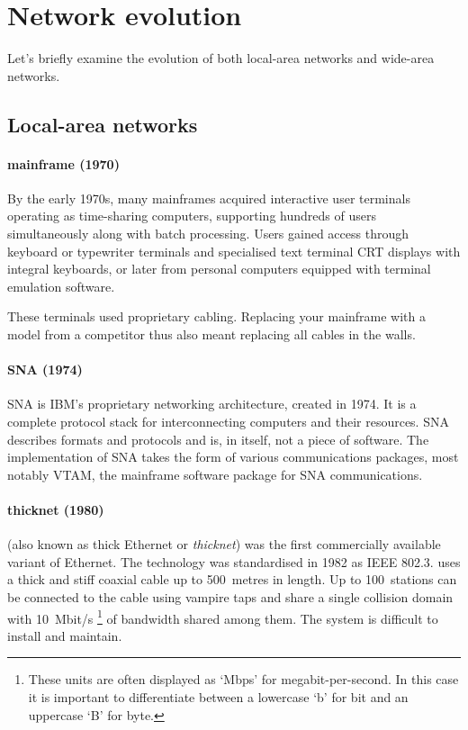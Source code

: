 \section{Network evolution}
\label{sec:network-evolution}

Let's briefly examine the evolution of both local-area networks and wide-area networks.

\subsection{Local-area networks}
\label{sec:network-evolution-lan}

\paragraph{mainframe (1970)}%
By the early 1970s, many mainframes acquired interactive user terminals operating as time-sharing computers, supporting hundreds of users simultaneously along with batch processing.
Users gained access through keyboard or typewriter terminals%
and specialised text terminal \gls{CRT} displays with integral keyboards, or later from personal computers equipped with terminal emulation software.

These terminals used proprietary cabling.
Replacing your mainframe with a model from a competitor thus also meant replacing all cables in the walls.
    
\paragraph{\acl{SNA} (1974)}
\Gls{SNA} is IBM's proprietary networking architecture, created in 1974.
It is a complete protocol stack for interconnecting computers and their resources.
\gls{SNA} describes formats and protocols and is, in itself, not a piece of software.
The implementation of \gls{SNA} takes the form of various communications packages, most notably \gls{VTAM}, the mainframe software package for \gls{SNA} communications.
    
\paragraph{thicknet (1980)}%
 (also known as thick Ethernet or \emph{thicknet}) was the first commercially available variant of Ethernet.
The technology was standardised in 1982 as \acs{IEEE} 802.3.
 uses a thick and stiff coaxial cable up to 500~metres in length.
Up to 100~stations can be connected to the cable using vampire taps and share a single collision domain with 10~Mbit/s%
   \footnote{These units are often displayed as `Mbps' for megabit-per-second. In this case it is important to differentiate between a lowercase `b' for bit and an uppercase `B' for byte.}
of bandwidth shared among them.
The system is difficult to install and maintain.

